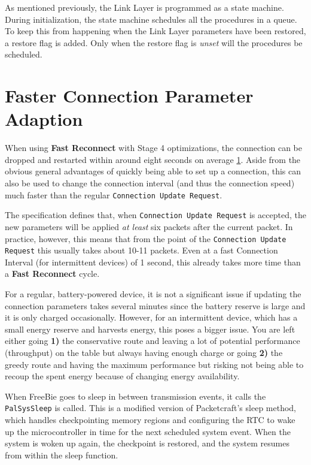 As mentioned previously, the Link Layer is programmed as a state machine. During initialization, the state machine schedules all the procedures in a queue. To keep this from happening when the Link Layer parameters have been restored, a restore flag is added. Only when the restore flag is \textit{unset} will the procedures be scheduled.

\section{Faster Connection Parameter Adaption}
When using \textbf{Fast Reconnect} with Stage 4 optimizations, the connection can be dropped and restarted within around eight seconds on average \ref{}. Aside from the obvious general advantages of quickly being able to set up a connection, this can also be used to change the connection interval (and thus the connection speed) much faster than the regular \texttt{Connection Update Request}.

The specification defines that, when \texttt{Connection Update Request} is accepted, the new parameters will be applied \textit{at least} six packets after the current packet. In practice, however, this means that from the point of the \texttt{Connection Update Request} this usually takes about 10-11 packets. Even at a fast Connection Interval (for intermittent devices) of 1 second, this already takes more time than a \textbf{Fast Reconnect} cycle. 

For a regular, battery-powered device, it is not a significant issue if updating the connection parameters takes several minutes since the battery reserve is large and it is only charged occasionally. However, for an intermittent device, which has a small energy reserve and harvests energy, this poses a bigger issue. You are left either going \textbf{1)} the conservative route and leaving a lot of potential performance (throughput) on the table but always having enough charge or going \textbf{2)} the greedy route and having the maximum performance but risking not being able to recoup the spent energy because of changing energy availability.

When FreeBie goes to sleep in between transmission events, it calls the \texttt{PalSysSleep} is called. This is a modified version of Packetcraft's sleep method, which handles checkpointing memory regions and configuring the RTC to wake up the microcontroller in time for the next scheduled system event. When the system is woken up again, the checkpoint is restored, and the system resumes from within the sleep function. 

